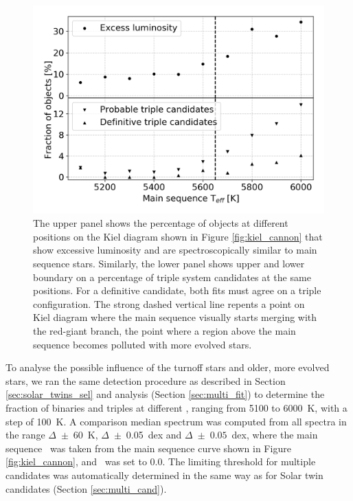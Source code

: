 \begin{figure}
	\centering
	\includegraphics[width=\columnwidth]{teff_triple_dist.png}
	\caption{The upper panel shows the percentage of objects at different positions on the Kiel diagram shown in Figure \ref{fig:kiel_cannon} that show excessive luminosity and are spectroscopically similar to main sequence stars. Similarly, the lower panel shows upper and lower boundary on a percentage of triple system candidates at the same positions. For a definitive candidate, both fits must agree on a triple configuration. The strong dashed vertical line repents a point on Kiel diagram where the main sequence visually starts merging with the red-giant branch, the point where a region above the main sequence becomes polluted with more evolved stars.}
	\label{fig:triple_hr}
\end{figure}

To analyse the possible influence of the turnoff stars and older, more evolved stars, we ran the same detection procedure as described in Section \ref{sec:solar_twins_sel} and analysis (Section \ref{sec:multi_fit}) to determine the fraction of binaries and triples at different \Teff, ranging from 5100 to 6000~K, with a step of 100~K. A comparison median spectrum was computed from all spectra in the range $\Delta$\Teff~$\pm$~60~K, $\Delta$\Logg~$\pm$~0.05~dex and $\Delta$\Feh~$\pm $~$0.05$~dex, where the main sequence \Logg\ was taken from the main sequence curve shown in Figure \ref{fig:kiel_cannon}, and \Feh\ was set to $0.0$. The limiting threshold for multiple candidates was automatically determined in the same way as for Solar twin candidates (Section \ref{sec:multi_cand}).

